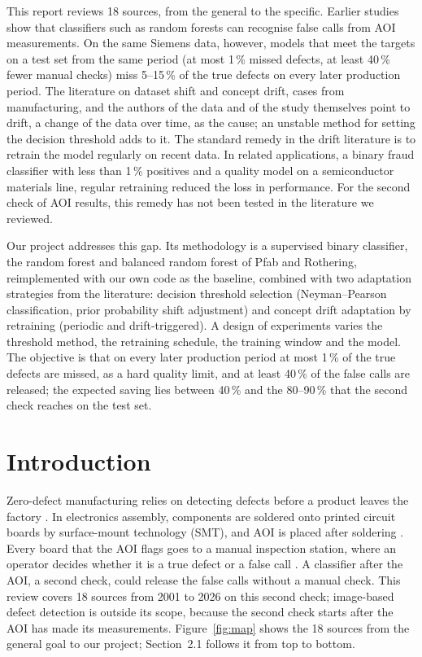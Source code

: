 \documentclass[11pt,a4paper]{article}
\begin{document}
This report reviews 18 sources, from the general to the specific. Earlier studies show that classifiers such as random forests can recognise false calls from AOI measurements. On the same Siemens data, however, models that meet the targets on a test set from the same period (at most 1\,\% missed defects, at least 40\,\% fewer manual checks) miss 5--15\,\% of the true defects on every later production period. The literature on dataset shift and concept drift, cases from manufacturing, and the authors of the data and of the study themselves point to drift, a change of the data over time, as the cause; an unstable method for setting the decision threshold adds to it. The standard remedy in the drift literature is to retrain the model regularly on recent data. In related applications, a binary fraud classifier with less than 1\,\% positives and a quality model on a semiconductor materials line, regular retraining reduced the loss in performance. For the second check of AOI results, this remedy has not been tested in the literature we reviewed.

Our project addresses this gap. Its methodology is a supervised binary classifier, the random forest and balanced random forest of Pfab and Rothering, reimplemented with our own code as the baseline, combined with two adaptation strategies from the literature: decision threshold selection (Neyman--Pearson classification, prior probability shift adjustment) and concept drift adaptation by retraining (periodic and drift-triggered). A design of experiments varies the threshold method, the retraining schedule, the training window and the model. The objective is that on every later production period at most 1\,\% of the true defects are missed, as a hard quality limit, and at least 40\,\% of the false calls are released; the expected saving lies between 40\,\% and the 80--90\,\% that the second check reaches on the test set.

\newpage
\tableofcontents
\listoffigures
\listoftables
\newpage

\section{Introduction}
Zero-defect manufacturing relies on detecting defects before a product leaves the factory \cite{psarommatis2020}. In electronics assembly, components are soldered onto printed circuit boards by surface-mount technology (SMT), and AOI is placed after soldering \cite{ebayyeh2020}. Every board that the AOI flags goes to a manual inspection station, where an operator decides whether it is a true defect or a false call \cite{pfab2024}. A classifier after the AOI, a second check, could release the false calls without a manual check. This review covers 18 sources from 2001 to 2026 on this second check; image-based defect detection is outside its scope, because the second check starts after the AOI has made its measurements. Figure~\ref{fig:map} shows the 18 sources from the general goal to our project; Section~2.1 follows it from top to bottom.
\end{document}
